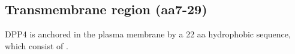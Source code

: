 \subsection{Transmembrane region (aa7-29)}

DPP4 is anchored in the plasma membrane by a 22 aa hydrophobic sequence, which consist of . \cite{Hong_1990}